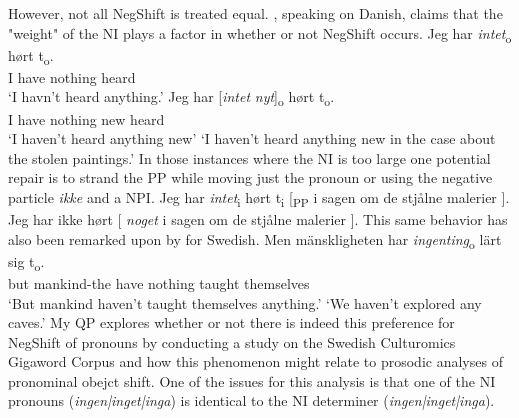 \documentclass[12pt, letterpaper]{article}
\begin{document}
\ex However, not all NegShift is treated equal. \citet[65f]{christensenInterfacesNegationSyntax2005}, speaking on Danish, claims that the "weight" of the NI plays a factor in whether or not NegShift occurs. 
	\ea
	\gll Jeg har \textit{intet}\textsubscript{o} hørt t\textsubscript{o}.\\
	I have nothing heard\\
	\glt  `I havn't heard anything.'
	\ex 
	\gll Jeg har [\textit{intet} \textit{nyt}]\textsubscript{o} hørt t\textsubscript{o}.\\
	I have nothing new heard\\
	\glt `I haven't heard anything new'
	\glt `I haven't heard anything new in the case about the stolen paintings.'
	\z
\ex In those instances where the NI is too large one potential repair is to strand the PP while moving just the pronoun or using the negative particle \textit{ikke} and a NPI.
	\ea Jeg har \textit{intet}\textsubscript{i} hørt t\textsubscript{i} [\textsubscript{PP} i sagen om de stjålne malerier ].
	\ex Jeg har ikke hørt [ \textit{noget} i sagen om de stjålne malerier ].
	\z   
\ex This same behavior has also been remarked upon by \citet{penkaNegativeIndefinites2011} for Swedish.
	\ea 
	\gll Men mänskligheten har \textit{ingenting}\textsubscript{o} lärt sig t\textsubscript{o}.\\
	but mankind-the have nothing taught themselves\\
	\glt `But mankind haven't taught themselves anything.'
	\glt `We haven't explored any caves.'
	\z 
\ex My QP explores whether or not there is indeed this preference for NegShift of pronouns by conducting a study on the Swedish Culturomics Gigaword Corpus \citep{eideSwedishCulturomicsGigaword2016} and how this phenomenon might relate to prosodic analyses of pronominal obejct shift.
\ex One of the issues for this analysis is that one of the NI pronouns (\textit{ingen|inget|inga}) is identical to the NI determiner (\textit{ingen|inget|inga}).
\z 
\end{document}
